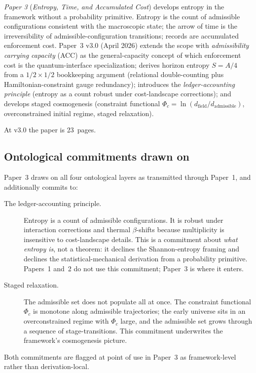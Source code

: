 \documentclass[11pt]{article}
\newcommand{\paperref}[2]{\emph{Paper #1} (\emph{#2})}
\begin{document}
\paperref{3}{Entropy, Time, and Accumulated Cost} develops entropy in the framework without a probability primitive. Entropy is the count of admissible configurations consistent with the macroscopic state; the arrow of time is the irreversibility of admissible-configuration transitions; records are accumulated enforcement cost. Paper~3 v3.0 (April 2026) extends the scope with \emph{admissibility carrying capacity} (ACC) as the general-capacity concept of which enforcement cost is the quantum-interface specialization; derives horizon entropy $S = A/4$ from a $1/2 \times 1/2$ bookkeeping argument (relational double-counting plus Hamiltonian-constraint gauge redundancy); introduces the \emph{ledger-accounting principle} (entropy as a count robust under cost-landscape corrections); and develops staged cosmogenesis (constraint functional $\Phi_c = \ln(d_{\mathrm{field}}/d_{\mathrm{admissible}})$, overconstrained initial regime, staged relaxation).

At v3.0 the paper is 23~pages.

\subsection{Ontological commitments drawn on}\label{sec:P3_commitments}

Paper~3 draws on all four ontological layers as transmitted through Paper~1, and additionally commits to:

\begin{description}
    \item[The ledger-accounting principle.] Entropy is a count of admissible configurations. It is robust under interaction corrections and thermal $\beta$-shifts because multiplicity is insensitive to cost-landscape details. This is a commitment about \emph{what entropy is}, not a theorem: it declines the Shannon-entropy framing and declines the statistical-mechanical derivation from a probability primitive. Papers~1 and~2 do not use this commitment; Paper~3 is where it enters.
    \item[Staged relaxation.] The admissible set does not populate all at once. The constraint functional $\Phi_c$ is monotone along admissible trajectories; the early universe sits in an overconstrained regime with $\Phi_c$ large, and the admissible set grows through a sequence of stage-transitions. This commitment underwrites the framework's cosmogenesis picture.
\end{description}

\noindent Both commitments are flagged at point of use in Paper~3 as framework-level rather than derivation-local.
\end{document}
